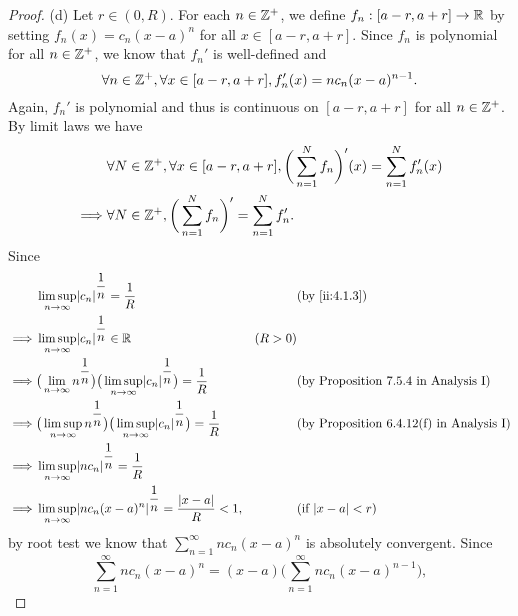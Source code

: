 \begin{proof}{(d)}
  Let \(r \in (0, R)\).
  For each \(n \in \mathbb{Z}^+\), we define \(f_n : [a - r, a + r] \to \mathbb{R}\) by setting \(f_n(x) = c_n (x - a)^n\) for all \(x \in [a - r, a + r]\).
  Since \(f_n\) is polynomial for all \(n \in \mathbb{Z}^+\), we know that \(f_n'\) is well-defined and
  \[
    \forall n \in \mathbb{Z}^+, \forall x \in [a - r, a + r], f_n'(x) = n c_n (x - a)^{n - 1}.
  \]
  Again, \(f_n'\) is polynomial and thus is continuous on \([a - r, a + r]\) for all \(n \in \mathbb{Z}^+\).
  By limit laws we have
  \begin{align*}
             & \forall N \in \mathbb{Z}^+, \forall x \in [a - r, a + r], \bigg(\sum_{n = 1}^N f_n\bigg)'(x) = \sum_{n = 1}^N f_n'(x) \\
    \implies & \forall N \in \mathbb{Z}^+, \bigg(\sum_{n = 1}^N f_n\bigg)' = \sum_{n = 1}^N f_n'.
  \end{align*}
  Since
  \begin{align*}
             & \limsup_{n \to \infty} \abs{c_n}^{\dfrac{1}{n}} = \dfrac{1}{R}                                                             &         & \by{ii:4.1.3}                                      \\
    \implies & \limsup_{n \to \infty} \abs{c_n}^{\dfrac{1}{n}} \in \R                                                                     & (R > 0)                                                   \\
    \implies & \big(\lim_{n \to \infty} n^{\dfrac{1}{n}}\big) \big(\limsup_{n \to \infty} \abs{c_n}^{\dfrac{1}{n}}\big) = \dfrac{1}{R}    &         & \text{(by Proposition 7.5.4 in Analysis I)}     \\
    \implies & \big(\limsup_{n \to \infty} n^{\dfrac{1}{n}}\big) \big(\limsup_{n \to \infty} \abs{c_n}^{\dfrac{1}{n}}\big) = \dfrac{1}{R} &         & \text{(by Proposition 6.4.12(f) in Analysis I)} \\
    \implies & \limsup_{n \to \infty} \abs{n c_n}^{\dfrac{1}{n}} = \dfrac{1}{R}                                                                                                                       \\
    \implies & \limsup_{n \to \infty} \abs{n c_n (x - a)^n}^{\dfrac{1}{n}} = \dfrac{\abs{x - a}}{R} < 1,                                  &         & \text{(if \(\abs{x - a} < r\))}
  \end{align*}
  by root test we know that \(\sum_{n = 1}^\infty n c_n (x - a)^n\) is absolutely convergent.
  Since
  \[
    \sum_{n = 1}^\infty n c_n (x - a)^n = (x - a) \bigg(\sum_{n = 1}^\infty n c_n (x - a)^{n - 1}\bigg),
\]
\end{proof}
